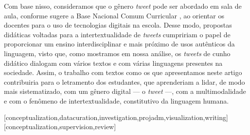\documentclass{textolivre}
\begin{document}
Com base nisso, consideramos que o gênero \textit{tweet} pode ser abordado em sala de aula, conforme sugere a Base Nacional Comum Curricular \cite{brasil_base_2018}, ao orientar os docentes para o uso de tecnologias digitais na escola. Desse modo, propostas didáticas voltadas para a intertextualidade de \textit{tweets} cumpririam o papel de proporcionar um ensino interdisciplinar e mais próximo de usos autênticos da linguagem, visto que, como mostramos em nossa análise, os \textit{tweets} de cunho didático dialogam com vários textos e com várias linguagens presentes na sociedade. Assim, o trabalho com textos como os que apresentamos neste artigo contribuiria para o letramento dos estudantes, que aprenderiam a lidar, de modo mais sistematizado, com um gênero digital — o \textit{tweet} —, com a multimodalidade e com o fenômeno de intertextualidade, constitutivo da linguagem humana.

\printbibliography\label{sec-bib}

\begin{contributors}
[conceptualization,datacuration,investigation,projadm,visualization,writing]
[conceptualization,supervision,review]
\end{contributors}
\end{document}
